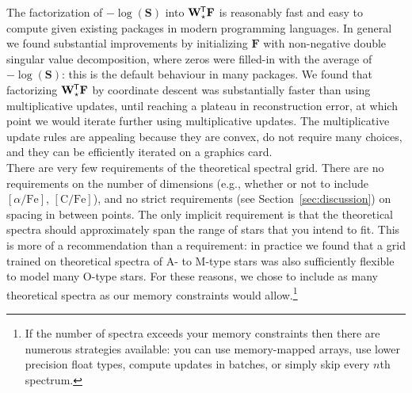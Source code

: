 \documentclass[modern]{aastex631}
\renewcommand{\vec}[1]{\mathbf{#1}}
\newcommand*{\transpose}{^{\mkern-1.5mu\mathsf{T}}}
\newcommand{\todo}[1]{\textcolor{tab:red}{#1}}
\begin{document}
The factorization of $-\log\left({\vec{S}}\right)$ into $\vec{W}_\star\transpose\vec{F}$ is reasonably fast and easy to compute given existing packages in modern programming languages. In general we found substantial improvements by initializing $\vec{F}$ with non-negative double singular value decomposition, where zeros were filled-in with the average of $-\log\left({\vec{S}}\right)$: this is the default behaviour in many packages. We found that factorizing $\vec{W}_\star\transpose\vec{F}$ by coordinate descent was substantially faster than using multiplicative updates, \todo{until reaching a plateau in reconstruction error, at which point we would iterate further using multiplicative updates.} The multiplicative update rules are appealing because they are convex, do not require many choices, and they can be efficiently iterated on a graphics card.\\


There are very few requirements of the theoretical spectral grid. There are no requirements on the number of dimensions (e.g., whether or not to include $[\alpha/\mathrm{Fe}]$, $[\mathrm{C/Fe}]$), and no strict requirements (see Section~\ref{sec:discussion}) on spacing in between points. The only implicit requirement is that the theoretical spectra should approximately span the range of stars that you intend to fit. This is more of a recommendation than a requirement: in practice we found that a grid trained on theoretical spectra of A- to M-type stars was also sufficiently flexible to model many O-type stars. For these reasons, we chose to include as many theoretical spectra as our memory constraints would allow.\footnote{If the number of spectra exceeds your memory constraints then there are numerous strategies available: you can use memory-mapped arrays, use lower precision float types, compute updates in batches, or simply skip every $n$th spectrum.}\\
\end{document}
